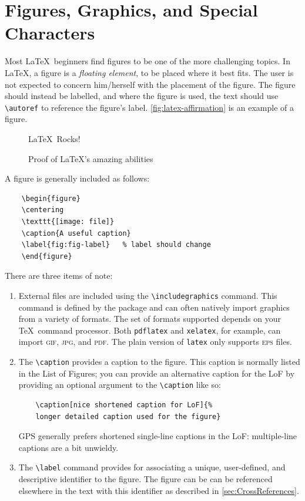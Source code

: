\section{Figures, Graphics, and Special Characters}
\label{sec:Graphics}

Most \LaTeX\ beginners find figures to be one of the more challenging
topics.  In \LaTeX, a figure is a \emph{floating element}, to be
placed where it best fits.
The user is not expected to concern him/herself with the placement
of the figure.  The figure should instead be labelled, and where
the figure is used, the text should use \verb+\autoref+ to reference
the figure's label.
\autoref{fig:latex-affirmation} is an example of a figure.
\begin{figure}
    \centering
    \Huge{\textsf{\LaTeX\ Rocks!}}
    \caption{Proof of \LaTeX's amazing abilities}
    \label{fig:latex-affirmation}   %
\end{figure}
A figure is generally included as follows:
\begin{lstlisting}
    \begin{figure}
    \centering
    \texttt{[image: file]}
    \caption{A useful caption}
    \label{fig:fig-label}   % label should change
    \end{figure}
\end{lstlisting}
There are three items of note:
\begin{enumerate}
\item External files are included using the \verb+\includegraphics+
    command.  This command is defined by the  package
    and can often natively import graphics from a variety of formats.
    The set of formats supported depends on your \TeX\ command processor.
    Both \texttt{pdflatex} and \texttt{xelatex}, for example, can
    import \textsc{gif}, \textsc{jpg}, and \textsc{pdf}.  The plain
    version of \texttt{latex} only supports \textsc{eps} files.

\item The \verb+\caption+ provides a caption to the figure. 
    This caption is normally listed in the List of Figures; you
    can provide an alternative caption for the LoF by providing
    an optional argument to the \verb+\caption+ like so:
    \begin{lstlisting}
    \caption[nice shortened caption for LoF]{%
	longer detailed caption used for the figure}
    \end{lstlisting}
    \ac{GPS} generally prefers shortened single-line captions
    in the LoF: multiple-line captions are a bit unwieldy.

\item The \verb+\label+ command provides for associating a unique, user-defined,
    and descriptive identifier to the figure.  The figure can be
    can be referenced elsewhere in the text with this identifier
    as described in \autoref{sec:CrossReferences}.
\end{enumerate}
